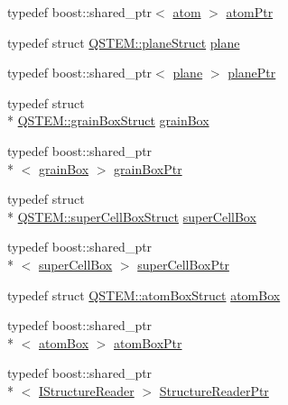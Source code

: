 \begin{DoxyCompactItemize}
\item 
typedef boost\-::shared\-\_\-ptr$<$ \hyperlink{namespace_q_s_t_e_m_a402dabc31a7a1fe906d0cdd138c69686}{atom} $>$ \hyperlink{namespace_q_s_t_e_m_aab1af41d80d466190a68f7b9da5740bc}{atom\-Ptr}
\item 
typedef struct \hyperlink{struct_q_s_t_e_m_1_1plane_struct}{Q\-S\-T\-E\-M\-::plane\-Struct} \hyperlink{namespace_q_s_t_e_m_a3fcdd3743dc6202901c46d6c22f3fd1c}{plane}
\item 
typedef boost\-::shared\-\_\-ptr$<$ \hyperlink{namespace_q_s_t_e_m_a3fcdd3743dc6202901c46d6c22f3fd1c}{plane} $>$ \hyperlink{namespace_q_s_t_e_m_ad1e29d7e576e38eb5e76380847534c9c}{plane\-Ptr}
\item 
typedef struct \\*
\hyperlink{struct_q_s_t_e_m_1_1grain_box_struct}{Q\-S\-T\-E\-M\-::grain\-Box\-Struct} \hyperlink{namespace_q_s_t_e_m_afc13846814505527653b1f6a2377b926}{grain\-Box}
\item 
typedef boost\-::shared\-\_\-ptr\\*
$<$ \hyperlink{namespace_q_s_t_e_m_afc13846814505527653b1f6a2377b926}{grain\-Box} $>$ \hyperlink{namespace_q_s_t_e_m_adf02490820ebdc3eb2b77754a5235eac}{grain\-Box\-Ptr}
\item 
typedef struct \\*
\hyperlink{struct_q_s_t_e_m_1_1super_cell_box_struct}{Q\-S\-T\-E\-M\-::super\-Cell\-Box\-Struct} \hyperlink{namespace_q_s_t_e_m_a95dba085aec372efb54903125453c0c1}{super\-Cell\-Box}
\item 
typedef boost\-::shared\-\_\-ptr\\*
$<$ \hyperlink{namespace_q_s_t_e_m_a95dba085aec372efb54903125453c0c1}{super\-Cell\-Box} $>$ \hyperlink{namespace_q_s_t_e_m_a4c41158ec44b9a0121ef647bfa3bf4b0}{super\-Cell\-Box\-Ptr}
\item 
typedef struct \hyperlink{struct_q_s_t_e_m_1_1atom_box_struct}{Q\-S\-T\-E\-M\-::atom\-Box\-Struct} \hyperlink{namespace_q_s_t_e_m_a01d849e4884ae956a16b24c2286e3494}{atom\-Box}
\item 
typedef boost\-::shared\-\_\-ptr\\*
$<$ \hyperlink{namespace_q_s_t_e_m_a01d849e4884ae956a16b24c2286e3494}{atom\-Box} $>$ \hyperlink{namespace_q_s_t_e_m_a834093bc53d08abeb557de742e38541e}{atom\-Box\-Ptr}
\item 
typedef boost\-::shared\-\_\-ptr\\*
$<$ \hyperlink{class_q_s_t_e_m_1_1_i_structure_reader}{I\-Structure\-Reader} $>$ \hyperlink{namespace_q_s_t_e_m_a3496fb9b2de0f3b3350f9b0d5206bc75}{Structure\-Reader\-Ptr}

\end{DoxyCompactItemize}

